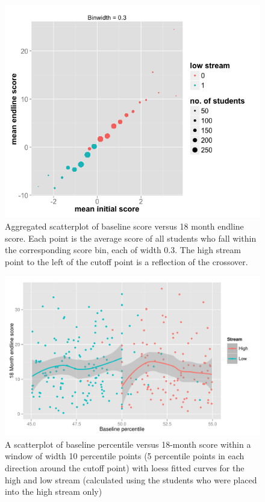 \documentclass[11pt]{article}
\begin{document}
  \begin{figure}[H]
 \centering
 \includegraphics[scale=0.5]{RD_initial.png}
 \caption{Aggregated scatterplot of baseline score versus 18 month endline score. Each point is the average score of all students who fall within the corresponding score bin, each of width 0.3. The high stream point to the left of the cutoff point is a reflection of the crossover.}
 \label{fig:RD_big}
 \end{figure}

  \begin{figure}[H]
 \centering
 \includegraphics[scale=0.6]{RD_scatter.pdf}
 \caption{A scatterplot of baseline percentile versus 18-month score within a window of width 10 percentile points (5 percentile points in each direction around the cutoff point) with loess fitted curves for the high and low stream (calculated using the students who were placed into the high stream only)}
 \label{fig:RD_scatter}
 \end{figure}
\end{document}
